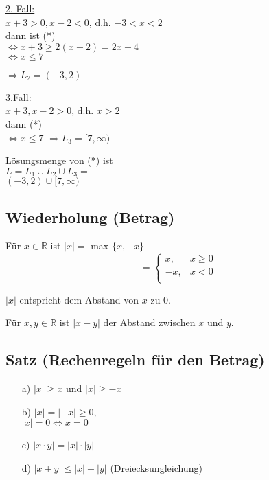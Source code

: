 \documentclass[a4paper, 12pt, twoside] {article}
\begin{document}
\underline{2. Fall:} \\
$x + 3 > 0, x - 2 < 0$, d.h. $-3 < x < 2$ \\
dann ist (*) \\
$\Leftrightarrow x + 3 \geq 2(x-2) = 2x -4$ \\
$\Leftrightarrow x \leq 7$

$\Rightarrow L_2 = (-3, 2)$

\underline{3.Fall:} \\
$x + 3, x - 2 > 0$, d.h. $x > 2$ \\
dann (*) \\
$\Leftrightarrow x \leq 7$
$\Rightarrow L_3 = [7, \infty)$

Lösungsmenge von (*) ist \\
$L = L_1 \cup L_2 \cup L_3 =$ \\
$(-3, 2) \cup [7, \infty)$

\subsection{Wiederholung (Betrag)} %
Für $x \in \mathbb{R}$ ist $|x| = $ max $\{x, -x\}$ \\
\[ =
  \begin{cases}
    x, & x \geq 0 \\
   - x, & x < 0 \\
  \end{cases}
\]

$|x|$ entspricht dem Abstand von $x$ zu $0$.

Für $x, y \in \mathbb{R}$ ist $|x - y|$ der Abstand zwischen $x$ und $y$.

\subsection{Satz (Rechenregeln für den Betrag)}

\begin{itemize}

\item[a)] $|x| \geq x$ und $|x| \geq -x$

\item[b)] $|x| = |-x| \geq 0$, \\
$|x| = 0 \Leftrightarrow x = 0$

\item[c)] $|x \cdot y| = |x| \cdot |y|$

\item[d)] $|x+y| \leq |x| + |y|$ (Dreiecksungleichung)

\end{itemize}
\end{document}

